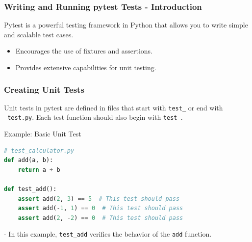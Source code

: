 \documentclass{beamer}
\begin{document}
\begin{frame}[fragile]
    \frametitle{Writing and Running pytest Tests - Introduction}
    Pytest is a powerful testing framework in Python that allows you to write simple and scalable test cases.
    \begin{itemize}
        \item Encourages the use of fixtures and assertions.
        \item Provides extensive capabilities for unit testing.
    \end{itemize}
\end{frame}

\begin{frame}[fragile]
    \frametitle{Creating Unit Tests}
    Unit tests in pytest are defined in files that start with \texttt{test\_} or end with \texttt{\_test.py}. Each test function should also begin with \texttt{test\_}.
    
    \begin{block}{Example: Basic Unit Test}
    \begin{lstlisting}[language=Python]
# test_calculator.py
def add(a, b):
    return a + b

def test_add():
    assert add(2, 3) == 5  # This test should pass
    assert add(-1, 1) == 0  # This test should pass
    assert add(2, -2) == 0  # This test should pass
    \end{lstlisting}
    \end{block}
    
    - In this example, \texttt{test\_add} verifies the behavior of the \texttt{add} function.
\end{frame}
\end{document}
